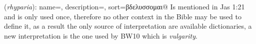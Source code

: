 \item[Vulgarity,]

(\textit{rhyparia}):
{
    name=,
    description={},
    sort=βδελυσσομαι@
}
Is mentioned in Jas 1:21 and is only used once, therefore no other context in the Bible may be used to define it, 
as a result the only source of interpretation are available dictionaries, a new interpretation is the one used by 
BW10 which is \emph{vulgarity}. 
